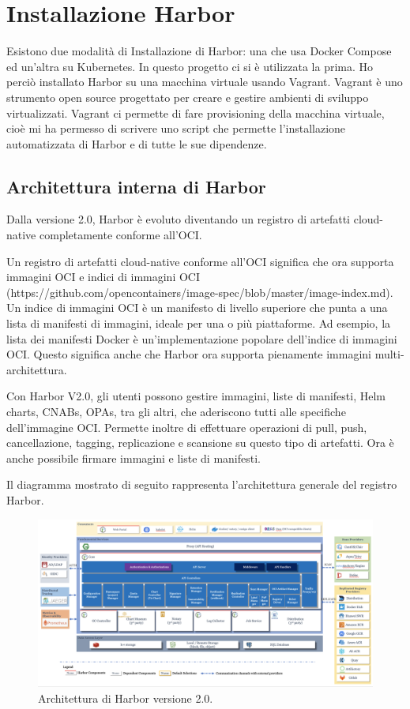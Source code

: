 \documentclass[12pt,a4paper]{report}
\begin{document}
\chapter{Installazione Harbor}
Esistono due modalità di Installazione di Harbor: una che usa Docker Compose ed un'altra su Kubernetes. In questo progetto ci si è utilizzata la prima. Ho perciò installato Harbor su una macchina virtuale usando Vagrant. Vagrant è uno strumento open source progettato per creare e gestire ambienti di sviluppo virtualizzati. Vagrant ci permette di fare provisioning della macchina virtuale, cioè mi ha permesso di scrivere uno script che permette l'installazione automatizzata di Harbor e di tutte le sue dipendenze.
\section{Architettura interna di Harbor}
Dalla versione 2.0, Harbor è evoluto diventando un registro di artefatti cloud-native completamente conforme all'OCI.

Un registro di artefatti cloud-native conforme all'OCI significa che ora supporta immagini OCI e indici di immagini OCI (https://github.com/opencontainers/image-spec/blob/master/image-index.md). Un indice di immagini OCI è un manifesto di livello superiore che punta a una lista di manifesti di immagini, ideale per una o più piattaforme. Ad esempio, la lista dei manifesti Docker è un'implementazione popolare dell'indice di immagini OCI. Questo significa anche che Harbor ora supporta pienamente immagini multi-architettura.

Con Harbor V2.0, gli utenti possono gestire immagini, liste di manifesti, Helm charts, CNABs, OPAs, tra gli altri, che aderiscono tutti alle specifiche dell'immagine OCI. Permette inoltre di effettuare operazioni di pull, push, cancellazione, tagging, replicazione e scansione su questo tipo di artefatti. Ora è anche possibile firmare immagini e liste di manifesti.

Il diagramma mostrato di seguito rappresenta l'architettura generale del registro Harbor.

\begin{figure}[h]
\centering
\includegraphics[width=\textwidth]{images/architecture.png}
\caption{Architettura di Harbor versione 2.0.}
\end{figure}
\end{document}
